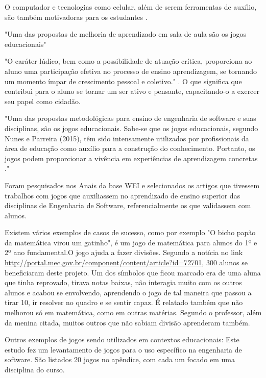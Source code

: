 O computador e tecnologias como celular, além de serem ferramentas de auxílio, são também  motivadoras para os estudantes \cite{softwaregamificado}.


"Uma das propostas de melhoria de aprendizado em sala de aula são os jogos educacionais" \cite[p. 4]{sucessoJogoEngSoft}


"O caráter lúdico, bem como a possibilidade de atuação crítica, proporciona ao aluno uma participação efetiva no processo de ensino aprendizagem, se tornando um momento ímpar de crescimento pessoal e coletivo." \cite{jogoPratPedagoc}. O que significa que contribui para o aluno se tornar um ser ativo e pensante, capacitando-o a exercer seu papel como cidadão.




"Uma das propostas metodológicas para ensino de engenharia de software e suas disciplinas, são os jogos educacionais. Sabe-se que os jogos educacionais, segundo Nunes e Parreira (2015), têm sido intensamente utilizados por profissionais da área de educação como auxílio para a construção do conhecimento. Portanto, os jogos podem proporcionar a vivência em experiências de aprendizagem concretas ."



\begin{citacao}
Foram pesquisados nos Anais da base WEI e selecionados os artigos que tivessem trabalhos com jogos que auxiliassem no aprendizado de ensino superior das disciplinas de Engenharia de Software, referencialmente os que validassem com alunos. \cite{sucessoJogoEngSoft}
\end{citacao}

 
Existem vários exemplos de casos de sucesso, como por exemplo "O bicho papão da matemática virou um gatinho", é um jogo de matemática para alunos do 1º e 2º ano fundamental.O jogo ajuda a fazer divisões. Segundo a notícia no link \url{http://portal.mec.gov.br/component/content/article?id=72701}, 300 alunos se beneficiaram deste projeto. Um dos símbolos que ficou marcado era de uma aluna que tinha reprovado, tirava notas baixas, não interagia muito com os outros alunos e acabou se envolvendo, aprendendo o jogo de tal maneira que passou a tirar 10, ir resolver no quadro e se sentir capaz. É relatado também que não melhorou só em matemática, como em outras matérias. Segundo o professor, além da menina citada, muitos outros que não sabiam divisão aprenderam também.

Outros exemplos de jogos sendo utilizados em contextos educacionais: Este estudo \cite{sucessoJogoEngSoft} fez um levantamento de jogos para o uso específico na engenharia de software. São listados 20 jogos no apêndice, com cada um focado em uma disciplina do curso. 

